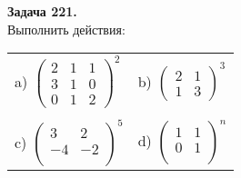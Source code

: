 \documentclass[a4paper, 12pt]{article}
\newenvironment{problem}[2][Задача]
    { \begin{mdframed}[backgroundcolor=gray!10] \textbf{#1 #2.} \\}
    {  \end{mdframed}}
\begin{document}
\begin{problem}{221}
Выполнить действия: \\
\noindent
\begin{tabular}{ll}
a) 
$\left(
\begin{array}{rrr}
2 & 1 & 1\\
3 & 1 & 0\\
0 & 1 & 2
\end{array}
\right)^2
$ 
& b)
$\left(
\begin{array}{rr}
2 & 1 \\
1 & 3
\end{array}
\right)^3
$ \\
 & \\
c)
$\left(
\begin{array}{rr}
3 & 2 \\
-4 & -2 \\
\end{array}
\right)^5
$
& d)
$\left(
\begin{array}{rr}
1 & 1 \\
0 & 1 \\
\end{array}
\right)^n
$
\\
\end{tabular}

\end{problem}
\end{document}
